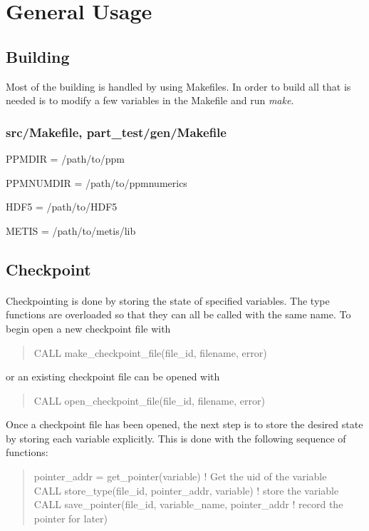 \documentclass{article}
\begin{document}
\section{General Usage}
\subsection{Building}
Most of the building is handled by using Makefiles. In order to build all that is needed is to modify a few variables in the Makefile and run \emph{make}.
\subsubsection*{src/Makefile, part\_test/gen/Makefile}
\begin{list}{}{}
\item PPMDIR = /path/to/ppm
\item PPMNUMDIR = /path/to/ppmnumerics
\item HDF5 = /path/to/HDF5
\item METIS = /path/to/metis/lib
\end{list}

\subsection{Checkpoint}
\paragraph{}
Checkpointing is done by storing the state of specified variables. The type functions are overloaded so that they can all be called with the same name. To begin open a new checkpoint file with
\begin{quote}
CALL make\_checkpoint\_file(file\_id, filename, error)
\end{quote}
or an existing checkpoint file can be opened with
\begin{quote}
   CALL open\_checkpoint\_file(file\_id, filename, error)
\end{quote}

Once a checkpoint file has been opened, the next step is to store the desired state by storing each variable explicitly. This is done with the following sequence of functions:
\begin{quote}
   pointer\_addr = get\_pointer(variable) ! Get the uid of the variable \\
   CALL store\_type(file\_id, pointer\_addr, variable) ! store the variable \\
   CALL save\_pointer(file\_id, variable\_name, pointer\_addr ! record the pointer for later) \\
\end{quote}
\end{document}
